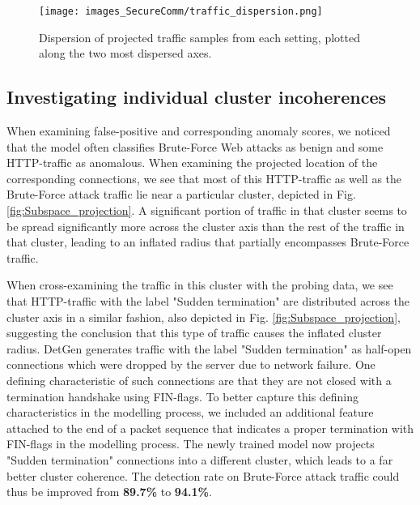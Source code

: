 

\begin{figure}
\centering
\texttt{[image: images\_SecureComm/traffic\_dispersion.png]}
\caption{Dispersion of projected traffic samples from each setting, plotted along the two most dispersed axes.}\label{fig:Subspace_disp}
\end{figure}



\subsection{Investigating individual cluster incoherences}


When examining false-positive and corresponding anomaly scores, we noticed that the model often classifies Brute-Force Web attacks as benign and some HTTP-traffic as anomalous. When examining the projected location of the corresponding connections, we see that most of this HTTP-traffic as well as the Brute-Force attack traffic lie near a particular cluster, depicted in Fig. \ref{fig:Subspace_projection}. A significant portion of traffic in that cluster seems to be spread significantly more across the cluster axis than the rest of the traffic in that cluster, leading to an inflated radius that partially encompasses Brute-Force traffic. 

When cross-examining the traffic in this cluster with the probing data, we see that HTTP-traffic with the label "Sudden termination" are distributed across the cluster axis in a similar fashion, also depicted in Fig. \ref{fig:Subspace_projection}, suggesting the conclusion that this type of traffic causes the inflated cluster radius. DetGen generates traffic with the label "Sudden termination" as half-open connections which were dropped by the server due to network failure. One defining characteristic of such connections are that they are not closed with a termination handshake using FIN-flags. To better capture this defining characteristics in the modelling process, we included an additional feature attached to the end of a packet sequence that indicates a proper termination with FIN-flags in the modelling process.
The newly trained model now projects "Sudden termination" connections into a different cluster, which leads to a far better cluster coherence. The detection rate on Brute-Force attack traffic could thus be improved from \textbf{89.7\%} to \textbf{94.1\%}.

